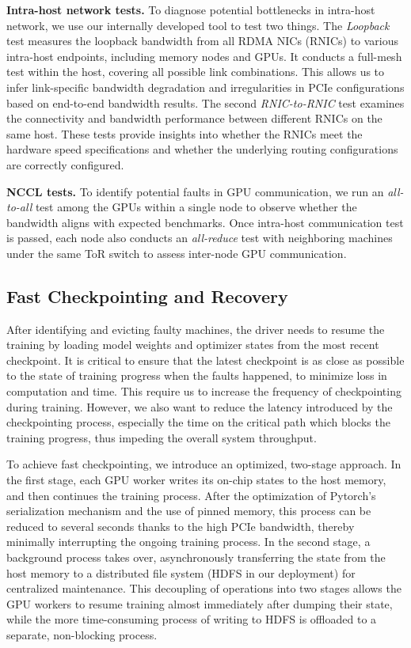 \documentclass[letterpaper,twocolumn,10pt]{article}
\newcommand{\parabf}[1]{\medskip\noindent\textbf{#1}}
\begin{document}
\parabf{Intra-host network tests.} To diagnose potential bottlenecks in
intra-host network, we use our internally developed tool to test two things. The
\textit{Loopback} test measures the loopback bandwidth from all RDMA NICs
(RNICs) to various intra-host endpoints, including memory nodes and GPUs. It
conducts a full-mesh test within the host, covering all possible link
combinations. This allows us to infer link-specific bandwidth degradation and
irregularities in PCIe configurations based on end-to-end bandwidth results. The
second \textit{RNIC-to-RNIC} test examines the connectivity and bandwidth
performance between different RNICs on the same host. These tests provide
insights into whether the RNICs meet the hardware speed specifications and
whether the underlying routing configurations are correctly configured.

\parabf{NCCL tests.} To identify potential faults in GPU communication, we run
an \textit{all-to-all} test among the GPUs within a single node to observe
whether the bandwidth aligns with expected benchmarks. Once intra-host
communication test is passed, each node also conducts an \textit{all-reduce}
test with neighboring machines under the same ToR switch to assess inter-node
GPU communication.

\subsection{Fast Checkpointing and Recovery}
\label{sec:checkpoint}

After identifying and evicting faulty machines, the driver needs to resume the
training by loading model weights and optimizer states from the most recent
checkpoint. It is critical to ensure that the latest
checkpoint is as close as possible to the state of training progress when the
faults happened, to minimize loss in computation and time. This require us
to increase the frequency of checkpointing during training. However, we also
want to reduce the latency introduced by the checkpointing process, especially
the time on the critical path which blocks the training progress, thus impeding
the overall system throughput.

To achieve fast checkpointing, we introduce an optimized, two-stage approach. In
the first stage, each GPU worker writes its on-chip states to the host memory,
and then continues the training process. After the optimization of Pytorch's
serialization mechanism and the use of pinned memory, this process can be
reduced to several seconds thanks to the high PCIe bandwidth, thereby minimally
interrupting the ongoing training process. In the second stage, a background
process takes over, asynchronously transferring the state from the host memory
to a distributed file system (HDFS in our deployment) for centralized maintenance. This decoupling of operations into two
stages allows the GPU workers to resume training almost immediately after
dumping their state, while the more time-consuming process of writing to HDFS is
offloaded to a separate, non-blocking process.
\end{document}
